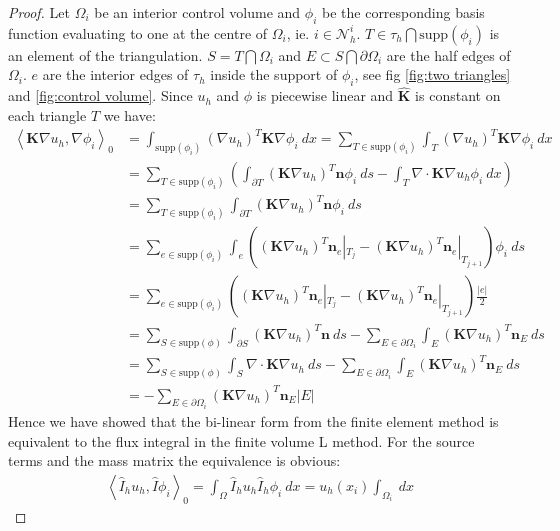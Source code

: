 \documentclass[../Main/main.tex]{subfiles}
\begin{document}
	\begin{proof}
		\item Let $\Omega_i$ be an interior control volume and $\phi_i$ be the corresponding basis function evaluating to one at the centre of $\Omega_i$, ie. $i \in \mathcal{N}_h^i$. $T \in \tau_h \bigcap \text{supp}(\phi_i)$ is an element of the triangulation. $S=T\bigcap \Omega_i$ and $E \subset S\bigcap \partial \Omega_i$ are the half edges of $\Omega_i$. $e$ are the interior edges of $\tau_h$ inside the support of $\phi_i$, see fig \ref{fig:two triangles} and \ref{fig:control volume}. Since $u_h$ and $\phi$ is piecewise linear and $\pmb{\hat{K}}$ is constant on each triangle $T$ we have:
		\begin{equation}\label{eq:big computation}
			\begin{aligned}
				\left \langle \pmb{K}\nabla u_h, \nabla \phi_i \right \rangle_0 &= \int_{\text{supp}(\phi_i)} (\nabla u_h)^T \pmb{K}\nabla \phi_i \ dx = \sum_{T\in \text{supp}(\phi_i)} \int_T (\nabla u_h)^T \pmb{K}\nabla \phi_i \ dx \\
				&= \sum_{T\in \text{supp}(\phi_i)} \left ( \int_{\partial T} (\pmb{K}\nabla u_h)^T \pmb{n}\phi_i \ ds-\int_T \nabla \cdot \pmb{K} \nabla u_h \phi_i \ dx \right ) \\
				&=\sum_{T\in \text{supp}(\phi_i)}\int_{\partial T} (\pmb{K}\nabla u_h)^T \pmb{n}\phi_i \ ds \\
				&= \sum_{e\in \text{supp}(\phi_i)} \int_e ((\pmb{K}\nabla u_h)^T \pmb{n}_e|_{T_{j}} - (\pmb{K}\nabla u_h)^T \pmb{n}_e|_{T_{j+1}})\phi_i \ ds\\
				&= \sum_{e\in \text{supp}(\phi_i)}
				((\pmb{K}\nabla u_h)^T \pmb{n}_e|_{T_{j}} - (\pmb{K}\nabla u_h)^T \pmb{n}_e|_{T_{j+1}}) \frac{|e|}{2}\\
				&=\sum_{S\in \text{supp}(\phi)}\int_{\partial S}  (\pmb{K}\nabla u_h)^T \pmb{n} \ ds - \sum_{E\in \partial \Omega_i}\int_E (\pmb{K}\nabla u_h)^T \pmb{n}_E \ ds\\
				&= \sum_{S\in \text{supp}(\phi)}\int_{ S} \nabla \cdot \pmb{K}\nabla u_h \ ds - \sum_{E\in \partial \Omega_i}\int_E (\pmb{K}\nabla u_h)^T \pmb{n}_E \ ds\\
				&=- \sum_{E\in \partial \Omega_i} (\pmb{K}\nabla u_h)^T \pmb{n}_E |E| 
			\end{aligned}
		\end{equation}
		Hence we have showed that the bi-linear form from the finite element method is equivalent to the flux integral in the finite volume L method. For the source terms and the mass matrix the equivalence is obvious:
		\begin{equation}
			\begin{aligned}
				\left \langle \hat{I}_h  u_h,\hat{I}\phi_i \right \rangle_0 = \int_{\Omega}\hat{I}_h u_h \hat{I}_h \phi_i \ dx = u_h(x_i) \int_{\Omega_i} \ dx
			\end{aligned}
		\end{equation}
	\end{proof}
	
\end{document}
